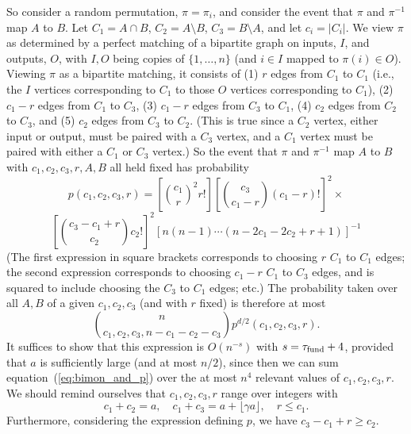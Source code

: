 \documentclass[12pt]{article}
\newcommand{\fund}{{\rm fund}}
\newcommand{\taufund}{{\tau_\fund}}
\newcommand{\intn}{{\{1,\ldots,n\}}}
\begin{document}
So consider a random
permutation, $\pi=\pi_i$, and consider the event that $\pi$
and $\pi^{-1}$ map $A$ to $B$.
Let $C_1=A\cap B$, $C_2=A\setminus B$, $C_3=B\setminus A$, and let
$c_i=|C_i|$.  
We view $\pi$ as determined by a perfect matching of a bipartite graph
on inputs, $I$, and outputs, $O$, with $I,O$ being copies of $\intn$
(and $i\in I$ mapped to $\pi(i)\in O$).
Viewing $\pi$ as a bipartite matching, it consists of
(1) $r$ edges from $C_1$ to $C_1$ (i.e., the $I$ vertices corresponding
to $C_1$ to those $O$ vertices corresponding to $C_1$),
(2) $c_1-r$ edges from $C_1$ to $C_3$, (3) $c_1-r$ edges from $C_3$ to
$C_1$, (4) $c_2$ edges from $C_2$ to $C_3$, and (5) $c_2$ edges from
$C_3$ to $C_2$.  (This is true since a $C_2$ vertex, either input or output,
must be paired with a $C_3$ vertex, and a $C_1$ vertex must be paired with
either a $C_1$ or $C_3$ vertex.)  So the event that $\pi$ and $\pi^{-1}$
map $A$ to $B$ with $c_1,c_2,c_3,r,A,B$ all held fixed has probability
$$
p(c_1,c_2,c_3,r)=\left[ \binom{c_1}{r}^2 r! \right]
\left[ \binom{c_3}{c_1-r} (c_1-r)! \right]^2 \times
$$
$$
\left[ \binom{c_3-c_1+r}{c_2} c_2! \right]^2
\left[ n(n-1)\cdots(n-2c_1-2c_2+r+1)\right]^{-1}
$$
(The first expression in square brackets corresponds to choosing $r$
$C_1$ to $C_1$ edges; the second expression corresponds
to choosing $c_1-r$ $C_1$ to
$C_3$ edges, and is squared to include choosing the $C_3$ to $C_1$ edges;
etc.)
The probability taken over all $A,B$ of a given $c_1,c_2,c_3$ (and with
$r$ fixed) is therefore at most
\begin{equation}\label{eq:bimon_and_p}
\binom{n}{c_1,c_2,c_3,n-c_1-c_2-c_3} p^{d/2}(c_1,c_2,c_3,r).
\end{equation}
It suffices to show that this expression is $O(n^{-s})$ with
$s=\taufund+4$,
provided that $a$ is sufficiently large (and at most $n/2$), since then
we can sum equation~(\ref{eq:bimon_and_p}) over the at most $n^4$ relevant
values of $c_1,c_2,c_3,r$.
We should remind
ourselves that $c_1,c_2,c_3,r$ range over integers with
$$
c_1+c_2=a,\quad
c_1+c_3=a+\lfloor \gamma a\rfloor,\quad
r \le c_1.
$$
Furthermore, considering the expression defining $p$, we have 
$c_3-c_1+r\ge c_2$.
\end{document}
